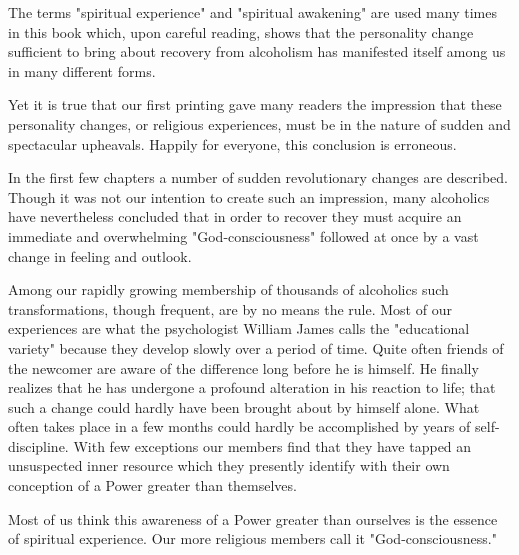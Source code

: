 


\begin{biblechapter}
    The terms "spiritual experience" 
    and "spiritual awakening" are used many times in this book 
    which, upon careful reading, 
    shows that the personality change 
    sufficient to bring about recovery from alcoholism has manifested
    itself among us in many different forms.

Yet it is true that our first printing 
    gave many readers the impression that these personality changes, 
    or religious experiences, 
    must be in the nature of sudden and spectacular upheavals.
\verse Happily for everyone, this conclusion is erroneous.

\verse In the first few chapters 
    a number of sudden revolutionary changes are described.
\verse Though it was not our intention to create such an impression, 
    many alcoholics have nevertheless concluded that 
    in order to recover they must acquire an immediate and overwhelming 
    "God-consciousness" 
    followed at once by a vast change in feeling and outlook.
\end{biblechapter}

\begin{biblechapter}
    Among our rapidly growing membership of thousands of alcoholics 
    such transformations, though frequent, are by no means the rule.
\verse Most of our experiences
    are what the psychologist William James calls 
    the "educational variety" 
    because they develop slowly over a period of time.
\verse Quite often friends of the newcomer are aware of the difference 
    long before he is himself.
\verse He finally realizes that he has undergone a profound alteration 
    in his reaction to life; 
    that such a change could hardly have been brought about 
    by himself alone.
\verse What often takes place in a few months 
    could hardly be accomplished by years of self-discipline.
\verse With few exceptions our members find 
    that they have tapped an unsuspected inner resource 
    which they presently identify with 
    their own conception of a Power greater than themselves.
 
Most of us think this awareness of a Power greater than ourselves 
    is the essence of spiritual experience.
\verse Our more religious members call it "God-consciousness."
\end{biblechapter}

